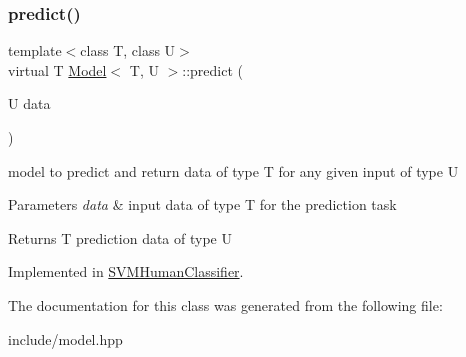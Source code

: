 \subsubsection{\texorpdfstring{predict()}{predict()}}
{\footnotesize\ttfamily template$<$class T, class U$>$ \\
virtual T \hyperlink{classModel}{Model}$<$ T, U $>$\+::predict (\begin{DoxyParamCaption}\item[{U}]{data }\end{DoxyParamCaption})\hspace{0.3cm}{\ttfamily [pure virtual]}}



model to predict and return data of type T for any given input of type U 


\begin{DoxyParams}{Parameters}
{\em data} & input data of type T for the prediction task \\
\hline
\end{DoxyParams}
\begin{DoxyReturn}{Returns}
T prediction data of type U 
\end{DoxyReturn}


Implemented in \hyperlink{classSVMHumanClassifier_a14a416a22355b1426d7611082dfa2464}{S\+V\+M\+Human\+Classifier}.



The documentation for this class was generated from the following file\+:\begin{DoxyCompactItemize}
\item 
include/model.\+hpp\end{DoxyCompactItemize}
